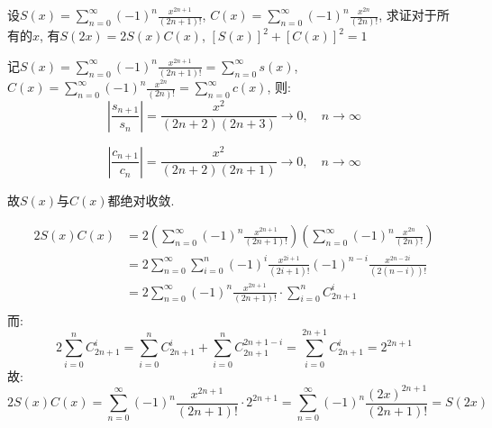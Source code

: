 \begin{problem}
    设\(S(x) = \sum_{n=0}^{\infty} (-1)^n \frac{x^{2n+1}}{(2n+1)!}\),
    \(C(x) = \sum_{n=0}^{\infty} (-1)^n \frac{x^{2n}}{(2n)!}\),
    求证对于所有的\(x\), 有\(S(2x)=2S(x)C(x)\), \([S(x)]^2+[C(x)]^2=1\)
\end{problem}


\begin{solution}
    记\(S(x) = \sum_{n=0}^{\infty} (-1)^n \frac{x^{2n+1}}{(2n+1)!} =
    \sum_{n=0}^{\infty} s(x)\), \(C(x) = \sum_{n=0}^{\infty} (-1)^n
    \frac{x^{2n}}{(2n)!} = \sum_{n=0}^{\infty} c(x)\), 则:
    \[
        \left\vert \frac{s_{n+1}}{s_{n}} \right\vert =
        \frac{x^2}{(2n+2)(2n+3)} \to 0, \quad n \to \infty
    \]

    \[
        \left\vert \frac{c_{n+1}}{c_{n}} \right\vert =
        \frac{x^2}{(2n+2)(2n+1)} \to 0, \quad n \to \infty
    \]

    故\(S(x)\)与\(C(x)\)都绝对收敛.

    \begin{align*}
        2S(x)C(x) & = 2\left( \sum_{n=0}^{\infty} (-1)^n
        \frac{x^{2n+1}}{(2n+1)!} \right)  \left(
            \sum_{n=0}^{\infty} (-1)^n
        \frac{x^{2n}}{(2n)!} \right)
        \\
        & = 2 \sum_{n=0}^{\infty} \sum_{i=0}^{n} (-1)^{i}
        \frac{x^{2i+1}}{(2i+1)!} (-1)^{n-i}
        \frac{x^{2n-2i}}{(2(n-i))!}           \\
        & = 2 \sum_{n=0}^{\infty} (-1)^n
        \frac{x^{2n+1}}{(2n+1)!} \cdot
        \sum_{i=0}^{n} C^{i}_{2n+1}
        \\
    \end{align*}
    而:
    \[
        2 \sum_{i=0}^{n} C^{i}_{2n+1} = \sum_{i=0}^{n} C^{i}_{2n+1} +
        \sum_{i=0}^{n} C^{2n+1-i}_{2n+1}  = \sum_{i=0}^{2n+1}
        C^{i}_{2n+1} = 2^{2n+1}
    \]
    故:
    \[
        2S(x)C(x) = \sum_{n=0}^{\infty} (-1)^n
        \frac{x^{2n+1}}{(2n+1)!}
        \cdot 2^{2n+1} = \sum_{n=0}^{\infty} (-1)^n
        \frac{(2x)^{2n+1}}{(2n+1)!} = S(2x)
    \]


\end{solution}
